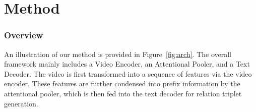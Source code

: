 \documentclass[letterpaper]{article}
\begin{document}
\section{Method}
\subsubsection{Overview}
An illustration of our method is provided in Figure~\ref{fig:arch}. The overall framework mainly includes a Video Encoder, an Attentional Pooler, and a Text Decoder.
The video is first transformed into a sequence of features via the video encoder.
These features are further condensed into prefix information by the attentional pooler, which is then fed into the text decoder for relation triplet generation.
\end{document}
